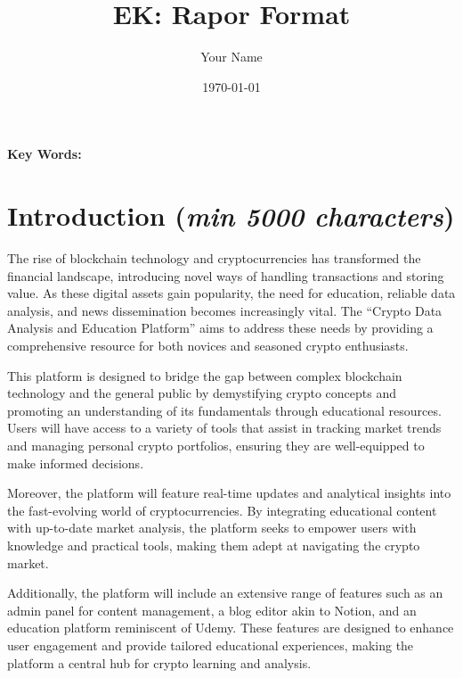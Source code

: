 \documentclass[12pt]{report}
\title{EK: Rapor Format}
\author{Your Name}
\date{\today}
\renewcommand{\thesection}{\arabic{section}}
\newcommand{\characters}[1]{(\textit{min #1 characters})}
\begin{document}
\maketitle

\begin{abstract}
\lipsum[1] %
\end{abstract}

\textbf{Key Words:} %

\tableofcontents
\renewcommand{\thechapter}{\arabic{chapter}}
\renewcommand{\thesection}{\arabic{section}}
\setcounter{secnumdepth}{0} %

\newpage

\section{Introduction \characters{5000}}
The rise of blockchain technology and cryptocurrencies has transformed the financial landscape, introducing novel ways of handling transactions and storing value. As these digital assets gain popularity, the need for education, reliable data analysis, and news dissemination becomes increasingly vital. The ``Crypto Data Analysis and Education Platform'' aims to address these needs by providing a comprehensive resource for both novices and seasoned crypto enthusiasts.

This platform is designed to bridge the gap between complex blockchain technology and the general public by demystifying crypto concepts and promoting an understanding of its fundamentals through educational resources. Users will have access to a variety of tools that assist in tracking market trends and managing personal crypto portfolios, ensuring they are well-equipped to make informed decisions.

Moreover, the platform will feature real-time updates and analytical insights into the fast-evolving world of cryptocurrencies. By integrating educational content with up-to-date market analysis, the platform seeks to empower users with knowledge and practical tools, making them adept at navigating the crypto market.

Additionally, the platform will include an extensive range of features such as an admin panel for content management, a blog editor akin to Notion, and an education platform reminiscent of Udemy. These features are designed to enhance user engagement and provide tailored educational experiences, making the platform a central hub for crypto learning and analysis.
\end{document}
